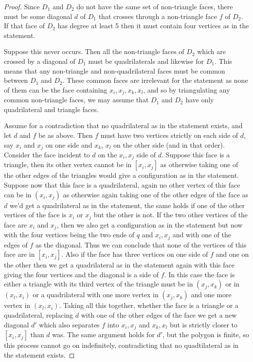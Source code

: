 \documentclass[11pt]{article}
\newcommand{\note}{\todo[color=green!40]}
\theoremstyle{remark}
\theoremstyle{definition}
\begin{document}
\begin{proof}
  Since $D_1$ and $D_2$ do not have the same set of non-triangle faces, there must be some diagonal $d$ of $D_1$ that crosses through a non-triangle face $f$ of $D_2$.  If that face of $D_2$ has degree at least 5 then it must contain four vertices as in the statement.

Suppose this never occurs.  Then all the non-triangle faces of $D_2$ which are crossed by a diagonal of $D_1$ must be quadrilaterals and likewise for $D_1$.  This means that any non-triangle and non-quadrilateral faces must be common between $D_1$ and $D_2$.  These common faces are irrelevant for the statement as none of them can be the face containing $x_i, x_j, x_k, x_l$, and so by triangulating any common non-triangle faces, we may assume that $D_1$ and $D_2$ have only quadrilateral and triangle faces.

Assume for a contradiction that no quadrilateral as in the statement exists, and let $d$ and $f$ be as above.  Then $f$ must have two vertices strictly on each side of $d$, say $x_i$ and $x_j$ on one side and $x_k$, $x_l$ on the other side (and in that order).  Consider the face incident to $d$ on the $x_i, x_j$ side of $d$.  Suppose this face is a triangle, then its other vertex cannot be in $[x_i, x_j]$ as otherwise taking one of the other edges of the triangles would give a configuration as in the statement.  Suppose now that this face is a quadrilateral, again no other vertex of this face can be in $(x_i, x_j)$ as otherwise again taking one of the other edges of the face as $d$ we'd get a quadrilateral as in the statement, the same holds if one of the other vertices of the face is $x_i$ or $x_j$ but the other is not.  If the two other vertices of the face are $x_i$ and $x_j$, then we also get a configuration as in the statement but now with the four vertices being the two ende of $q$ and $x_i, x_j$ and with one of the edges of $f$ as the diagonal.  Thus we can conclude that none of the vertices of this face are in $[x_i, x_j]$.  Also if the face has three vertices on one side of $f$ and one on the other then we get a quadrilateral as in the statement again with this face giving the four vertices and the diagonal is a side of $f$.  In this case the face is either a triangle with its third vertex of the triangle must be in $(x_j,x_k)$ or in $(x_l,x_i)$ or a quadrilateral with one more vertex in $(x_j, x_k)$ and one more vertex in $(x_l, x_i)$.  Taking all this together, whether the face is a triangle or a quadrilateral, replacing $d$ with one of the other edges of the face we get a new diagonal $d'$ which also separates $f$ into $x_i, x_j$ and $x_k, x_l$ but is strictly closer to $[x_i, x_j]$ than $d$ was.  The same argument holds for $d'$, but the polygon is finite, so this process cannot go on indefinitely, contradicting that no quadtilateral as in the statement exists.
\note{That huge paragraph also needs a picture}
\end{proof}
\end{document}
